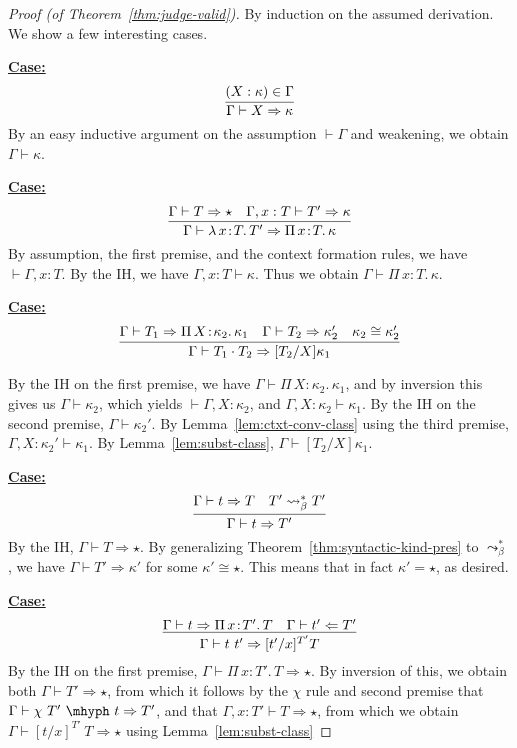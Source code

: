 \documentclass{article}
\newcommand{\abs}[4]{{#1}\, #2\! : \! #3.\, #4}
\newcommand{\tpcheck}[0]{\Leftarrow}
\newcommand{\tpsynth}[0]{\Rightarrow}
\newcommand{\startcase}[1]{\vspace{#1} \noindent\textbf{\underline{Case:}}}
\begin{document}
\begin{proof}[Proof (of Theorem~\ref{thm:judge-valid})]
  By induction on the assumed derivation.
  We show a few interesting cases.

  \startcase{.2cm}
  \[
    \infer{\Gamma \vdash X \tpsynth \kappa}{(X : \kappa) \in \Gamma}
  \]
  By an easy inductive argument on the assumption \(\vdash \Gamma\) and
  weakening, we obtain \(\Gamma \vdash \kappa\).

  \startcase{.2cm}
  \[
    \infer{\Gamma\vdash\abs{\lambda}{x}{T}{T'} \tpsynth \abs{\Pi}{x}{T}{\kappa}}{\Gamma \vdash T \tpsynth \star & \Gamma,x:T\vdash T'\tpsynth\kappa}
  \]
  By assumption, the first premise, and the context formation rules, we have
  \(\vdash \Gamma,x:T\).
  By the IH, we have \(\Gamma,x:T \vdash \kappa\).
  Thus we obtain \(\Gamma \vdash \abs{\Pi}{x}{T}{\kappa}\).

  \startcase{.2cm}
  \[
    \infer{\Gamma\vdash T_1 \cdot T_2 \tpsynth [T_2/X]\kappa_1}{\Gamma\vdash T_1 \tpsynth \abs{\Pi}{X}{\kappa_2}{\kappa_1} & \Gamma\vdash T_2 \tpsynth \kappa_2' & \kappa_2 \cong \kappa_2'}
  \]

  By the IH on the first premise, we have \(\Gamma \vdash
  \abs{\Pi}{X}{\kappa_2}{\kappa_1}\), and by inversion this gives us \(\Gamma
  \vdash \kappa_2\), which yields \(\vdash \Gamma,X:\kappa_2\), and
  \(\Gamma,X:\kappa_2 \vdash \kappa_1\).
  By the IH on the second premise, \(\Gamma \vdash \kappa_2'\).
  By Lemma~\ref{lem:ctxt-conv-class} using the third premise,
  \(\Gamma,X:\kappa_2' \vdash \kappa_1\).
  By Lemma~\ref{lem:subst-class}, \(\Gamma \vdash [T_2/X]\kappa_1\).

  \startcase{.2cm}
  \[
    \infer{\Gamma\vdash t\tpsynth T'}{\Gamma\vdash t \tpsynth T & T' \leadsto^*_\beta T'}
  \]
  By the IH, \(\Gamma \vdash T \tpsynth \star\).
  By generalizing Theorem~\ref{thm:syntactic-kind-pres} to \(\leadsto^*_\beta\),
  we have \(\Gamma \vdash T' \tpsynth \kappa'\) for some \(\kappa' \cong
  \star\).
  This means that in fact \(\kappa' = \star\), as desired.

  \startcase{.2cm}
  \[
    \infer{\Gamma\vdash t\ t' \tpsynth [t'/x]^{T'}T}{\Gamma\vdash t \tpsynth \abs{\Pi}{x}{T'}{T} & \Gamma\vdash t' \tpcheck T'}
  \]
  By the IH on the first premise, \(\Gamma \vdash \abs{\Pi}{x}{T'}{T} \tpsynth
  \star\).
  By inversion of this, we obtain both \(\Gamma \vdash T' \tpsynth \star\), from
  which it follows by the \(\chi\) rule and second premise that \(\Gamma \vdash
  \chi\ T'\ \mhyph\ t \tpsynth T'\), and that \(\Gamma,x:T' \vdash T \tpsynth
  \star\), from which we obtain \(\Gamma \vdash [t/x]^{T'}\ T \tpsynth \star\)
  using Lemma~\ref{lem:subst-class}


\end{proof}
\end{document}
